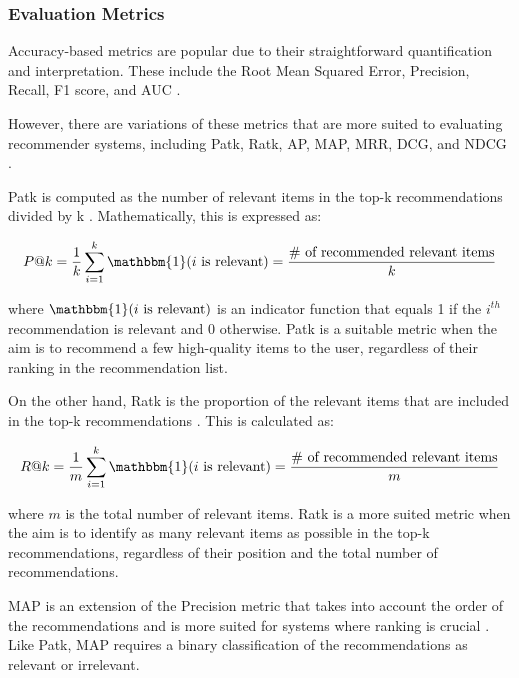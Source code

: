 \subsubsection*{Evaluation Metrics}

Accuracy-based metrics are popular due to their straightforward quantification and interpretation. These include the Root Mean Squared Error, Precision, Recall, F1 score, and AUC \cite{SilveiraHowGood2019,BaiScientificPaper2020,RicciRecommenderSystems2015}.

However, there are variations of these metrics that are more suited to evaluating recommender systems, including \ac{Patk}, \ac{Ratk}, \ac{AP}, \acf{MAP}, \ac{MRR}, \ac{DCG}, and \ac{NDCG} \cite{SilveiraHowGood2019}.

\ac{Patk} is computed as the number of relevant items in the top-k recommendations divided by k \cite{BaiScientificPaper2020}. Mathematically, this is expressed as:

\begin{align}
    P@k = \frac{1}{k} \sum_{i=1}^{k} \mathbbm{1}(i \text{ is relevant}) = \frac{\# \text{ of recommended relevant items}}{k} \label{eq:precision-at-k}
\end{align}

where $\mathbbm{1}(i \text{ is relevant})$ is an indicator function that equals 1 if the $i^{th}$ recommendation is relevant and 0 otherwise. \ac{Patk} is a suitable metric when the aim is to recommend a few high-quality items to the user, regardless of their ranking in the recommendation list.

On the other hand, \ac{Ratk} is the proportion of the relevant items that are included in the top-k recommendations \cite{BaiScientificPaper2020}. This is calculated as:

\begin{align}
    R@k = \frac{1}{m} \sum_{i=1}^{k} \mathbbm{1}(i \text{ is relevant}) = \frac{\# \text{ of recommended relevant items}}{m} \label{eq:recall-at-k}
\end{align}

where $m$ is the total number of relevant items. \ac{Ratk} is a more suited metric when the aim is to identify as many relevant items as possible in the top-k recommendations, regardless of their position and the total number of recommendations.

\ac{MAP} is an extension of the Precision metric that takes into account the order of the recommendations and is more suited for systems where ranking is crucial \cite{RinkMeanAverage2023,TaifiMRRVs2020,BaiScientificPaper2020}. Like \ac{Patk}, \ac{MAP} requires a binary classification of the recommendations as relevant or irrelevant.

